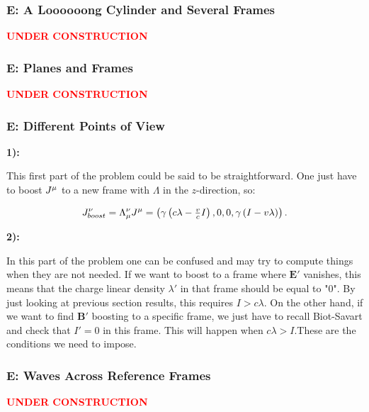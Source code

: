 \subsubsection{E: A Loooooong Cylinder and Several Frames}\label{E: A Loooooong Cylinder and Several Frames}

\textbf{\textcolor{red}{UNDER CONSTRUCTION}}

\subsubsection{E: Planes and Frames}\label{E: Planes and Frames}
\textbf{\textcolor{red}{UNDER CONSTRUCTION}}

\subsubsection{E: Different Points of View}\label{E: Different Points of View}

\textbf{1):}
	
This first part of the problem could be said to be straightforward. One just have to boost $J^{\mu}$ to a new frame with $\Lambda$ in the $z$-direction, so:

\begin{equation}
	J^{\nu}_{boost} = \Lambda^{\nu}_{\mu} J^{\mu} = \left(\gamma \left(c\lambda - \tfrac{v}{c} I\right),0,0, \gamma \left(I- v \lambda\right)\right).
\end{equation}

\textbf{2):}
	
In this part of the problem one can be confused and may try to compute things when they are not needed. If we want to boost to a frame where $\mathbf{E}'$ vanishes, this means that the charge linear density $\lambda'$ in that frame should be equal to "0". By just looking at previous section results, this requires $I > c\lambda$. On the other hand, if we want to find $\mathbf{B}'$ boosting to a specific frame, we just have to recall Biot-Savart and check that $I' = 0$ in this frame. This will happen when $c\lambda > I$.These are the conditions we need to impose.

\subsubsection{E: Waves Across Reference Frames}\label{E: Waves Across Reference Frames}
\textbf{\textcolor{red}{UNDER CONSTRUCTION}}


